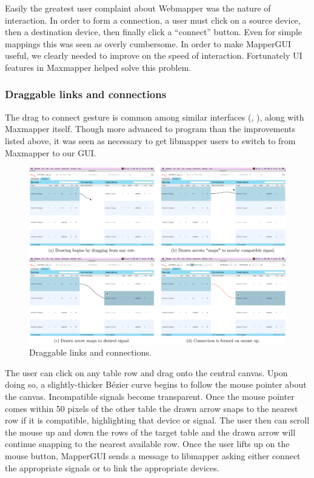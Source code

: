 Easily the greatest user complaint about Webmapper was the nature of interaction. In order to form a connection, a user must click on a source device, then a destination device, then finally click a ``connect'' button. Even for simple mappings this was seen as overly cumbersome. In order to make MapperGUI useful, we clearly needed to improve on the speed of interaction. Fortunately UI features in Maxmapper helped solve this problem.
	
		\subsubsection{Draggable links and connections}

The drag to connect gesture is common among similar interfaces (, ), along with Maxmapper itself. Though more advanced to program than the improvements listed above, it was seen as necessary to get libmapper users to switch to from Maxmapper to our GUI.

\begin{figure}[h]
	\centering
	\includegraphics[width=1\textwidth]{figures/drawing}
	\caption{Draggable links and connections.}
	\label{fig:drawing}
\end{figure}

The user can click on any table row and drag onto the central canvas. Upon doing so, a slightly-thicker B\'ezier curve begins to follow the mouse pointer about the canvas. Incompatible signals become transparent. Once the mouse pointer comes within 50 pixels of the other table the drawn arrow snaps to the nearest row if it is compatible, highlighting that device or signal. The user then can scroll the mouse up and down the rows of the target table and the drawn arrow will continue snapping to the nearest available row. Once the user lifts up on the mouse button, MapperGUI sends a message to libmapper asking either connect the appropriate signals or to link the appropriate devices.

